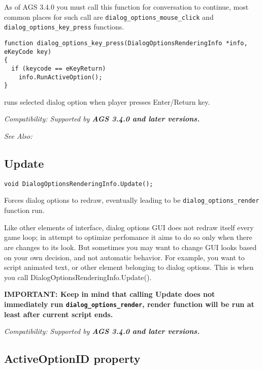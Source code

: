 As of AGS 3.4.0 you must call this function for conversation to continue, most common places
for such call are \verb$dialog_options_mouse_click$ and \verb$dialog_options_key_press$ functions.

\begin{verbatim}
function dialog_options_key_press(DialogOptionsRenderingInfo *info, eKeyCode key)
{
  if (keycode == eKeyReturn)
    info.RunActiveOption();
}
\end{verbatim}
runs selected dialog option when player presses Enter/Return key.

\it{Compatibility:} Supported by \bf{AGS 3.4.0} and later versions.

\it{See Also:} 


\subsection{Update}\label{DialogOptionsRenderingInfo.Update}%

\begin{verbatim}
void DialogOptionsRenderingInfo.Update();
\end{verbatim}
Forces dialog options to redraw, eventually leading to be \verb$dialog_options_render$ function run.

Like other elements of interface, dialog options GUI does not redraw itself every game loop;
in attempt to optimize perfomance it aims to do so only when there are changes to its look.
But sometimes you may want to change GUI looks based on your own decision, and not automatic
behavior. For example, you want to script animated text, or other element belonging to dialog
options. This is when you call DialogOptionsRenderingInfo.Update().

\bf{IMPORTANT:} Keep in mind that calling \bf{Update} does not immediately run \verb$dialog_options_render$,
render function will be run at least after current script ends.

\it{Compatibility:} Supported by \bf{AGS 3.4.0} and later versions.


\subsection{ActiveOptionID property}\label{DialogOptionsRenderingInfo.ActiveOptionID}%

